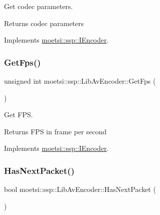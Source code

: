 Get codec parameters. 

\begin{DoxyReturn}{Returns}
codec parameters 
\end{DoxyReturn}


Implements \hyperlink{classmoetsi_1_1ssp_1_1IEncoder_ad5179efaa4c74207766dd64f46f4059a}{moetsi\+::ssp\+::\+I\+Encoder}.

\mbox{\label{classmoetsi_1_1ssp_1_1LibAvEncoder_ae21f81cb967359132183a29e04307933}} 
\subsubsection{\texorpdfstring{Get\+Fps()}{GetFps()}}
{\footnotesize\ttfamily unsigned int moetsi\+::ssp\+::\+Lib\+Av\+Encoder\+::\+Get\+Fps (\begin{DoxyParamCaption}{ }\end{DoxyParamCaption})\hspace{0.3cm}{\ttfamily [virtual]}}



Get F\+PS. 

\begin{DoxyReturn}{Returns}
F\+PS in frame per second 
\end{DoxyReturn}


Implements \hyperlink{classmoetsi_1_1ssp_1_1IEncoder_ae6a865aa52230d81aed1cb5232402f6c}{moetsi\+::ssp\+::\+I\+Encoder}.

\mbox{\label{classmoetsi_1_1ssp_1_1LibAvEncoder_a306c0935fa37bd35ddfeb8290289e927}} 
\subsubsection{\texorpdfstring{Has\+Next\+Packet()}{HasNextPacket()}}
{\footnotesize\ttfamily bool moetsi\+::ssp\+::\+Lib\+Av\+Encoder\+::\+Has\+Next\+Packet (\begin{DoxyParamCaption}{ }\end{DoxyParamCaption})\hspace{0.3cm}{\ttfamily [virtual]}}



